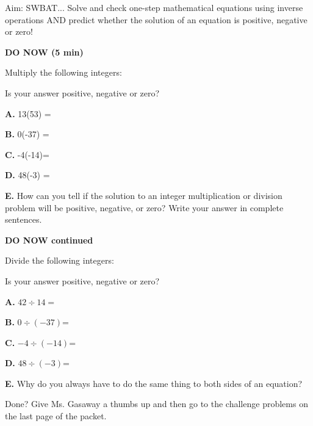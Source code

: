 \documentclass{article}
\begin{document}
	


Aim: SWBAT... Solve and check one-step mathematical equations using inverse operations AND predict whether the solution of an equation is positive, negative or zero! 
	
	\noindent\makebox[\linewidth]{\rule{\textwidth}{1pt}}
	
\textbf{DO NOW (5 min)}

\begin{minipage}[t]{0.6\textwidth}
	Multiply the following integers:
	

\end{minipage}
\begin{minipage}[t]{0.4\textwidth}
	Is your answer positive, negative or zero?
\end{minipage}

\noindent\makebox[\linewidth]{\rule{\textwidth}{1pt}}
\begin{description}
\item{\textbf{A. }} 13(53) = \hfill\answerbox
\item{\textbf{B. }} 0(-37) = \hfill\answerbox
\item{\textbf{C. }} -4(-14)= \hfill\answerbox
\item{\textbf{D. }} 48(-3) = \hfill\answerbox
\item{\textbf{E. }} How can you tell if the solution to an integer multiplication or division problem will be positive, negative, or zero? Write your answer in complete sentences.
\end{description}	
			
			
\pagebreak
\noindent\makebox[\linewidth]{\rule{\textwidth}{1pt}}
\textbf{DO NOW continued}

\begin{minipage}[t]{0.6\textwidth}
	Divide the following integers:
	

\end{minipage}
\begin{minipage}[t]{0.4\textwidth}
	Is your answer positive, negative or zero?
\end{minipage}

\noindent\makebox[\linewidth]{\rule{\textwidth}{1pt}}
\begin{description}
\item{\textbf{A. }} $42 \div 14 = $\hfill\answerbox
\item{\textbf{B. }} $0 \div (-37) $= \hfill\answerbox
\item{\textbf{C. }} $-4 \div (-14)$= \hfill\answerbox
\item{\textbf{D. }} $48 \div (-3) $= \hfill\answerbox
\hop
\item{\textbf{E. }} Why do you always have to do the same thing to both sides of an equation?
\end{description}	
\vfill
\begin{center}Done? Give Ms. Gasaway a thumbs up and then go to the challenge problems on the last page of the packet.
\end{center}
\pagebreak
\end{document}
